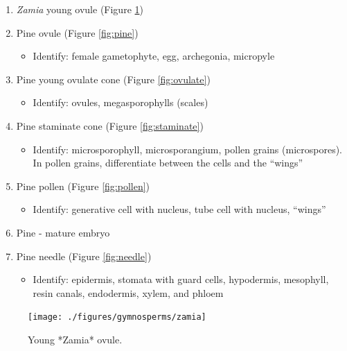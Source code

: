 \documentclass[]{book}
\providecommand{\tightlist}{%
  \setlength{\itemsep}{0pt}\setlength{\parskip}{0pt}}
\begin{document}
\begin{enumerate}
\def\labelenumi{\arabic{enumi}.}
\tightlist
\item
  \emph{Zamia} young ovule (Figure \ref{fig:zamia})
\item
  Pine ovule (Figure \ref{fig:pine})

  \begin{itemize}
  \tightlist
  \item
    Identify: female gametophyte, egg, archegonia, micropyle
  \end{itemize}
\item
  Pine young ovulate cone (Figure \ref{fig:ovulate})

  \begin{itemize}
  \tightlist
  \item
    Identify: ovules, megasporophylls (scales)
  \end{itemize}
\item
  Pine staminate cone (Figure \ref{fig:staminate})

  \begin{itemize}
  \tightlist
  \item
    Identify: microsporophyll, microsporangium, pollen grains (microspores). In pollen grains, differentiate between the cells and the ``wings''
  \end{itemize}
\item
  Pine pollen (Figure \ref{fig:pollen})

  \begin{itemize}
  \tightlist
  \item
    Identify: generative cell with nucleus, tube cell with nucleus, ``wings''
  \end{itemize}
\item
  Pine - mature embryo
\item
  Pine needle (Figure \ref{fig:needle})

  \begin{itemize}
  \tightlist
  \item
    Identify: epidermis, stomata with guard cells, hypodermis, mesophyll, resin canals, endodermis, xylem, and phloem
  \end{itemize}
\end{enumerate}

\begin{figure}

{\centering \texttt{[image: ./figures/gymnosperms/zamia]} 

}

\caption{Young *Zamia* ovule.}\label{fig:zamia}
\end{figure}
\end{document}
